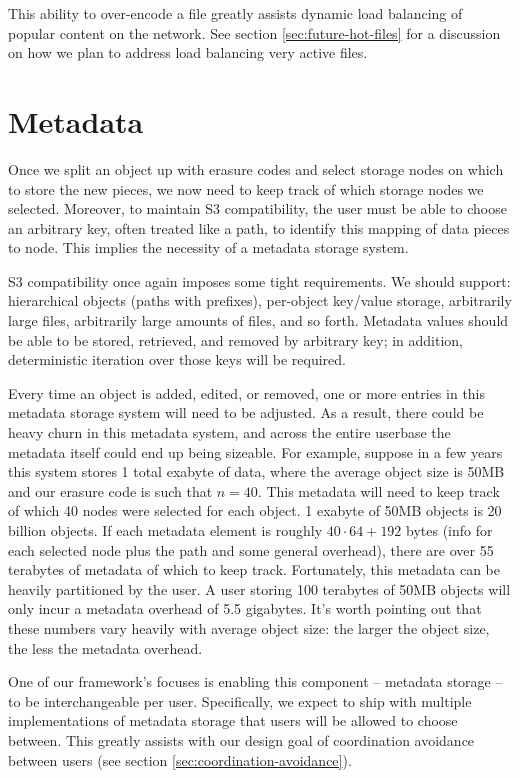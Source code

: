 \documentclass[11pt,fleqn,openany]{book}
\begin{document}
This ability to over-encode a file greatly assists dynamic load balancing of
popular content on the network. See section \ref{sec:future-hot-files} for
a discussion on how we plan to address load balancing very active files.

\section{Metadata}

Once we split an object up with erasure codes and select storage nodes on
which to store the new pieces, we now need to keep track of which storage
nodes we selected.
Moreover, to maintain S3 compatibility, the user must be able to choose an
arbitrary key, often treated like a path, to identify this mapping of data
pieces to node. This implies the necessity of a metadata storage system.

S3 compatibility once again imposes some tight requirements.
We should support:
hierarchical objects (paths with prefixes), per-object key/value storage,
arbitrarily large files, arbitrarily large amounts of files, and so forth.
Metadata values
should be able to be stored, retrieved, and removed by arbitrary key; in addition,
deterministic iteration over those keys will be required.

Every time an
object is added, edited, or removed, one or more entries in this metadata
storage system will need to be adjusted. As a result, there could be heavy churn
in this metadata system, and across the entire userbase the metadata itself
could end up being sizeable.
For example, suppose in
a few years this system stores 1 total exabyte of data, where the average object
size is 50MB and our erasure code is such that $n=40$. This metadata will need
to keep track of which 40 nodes were selected for each object.
1 exabyte of 50MB objects is 20 billion objects. If
each metadata element is roughly $40\cdot 64+192$ bytes (info for each
selected node plus the path and some general overhead), there are over 55
terabytes of metadata of which to keep track.
Fortunately, this metadata can be heavily partitioned by the user. A user storing
100 terabytes of 50MB objects will only incur a metadata overhead of 5.5
gigabytes. It's worth pointing out that these numbers vary
heavily with average object size: the larger the object size, the less the
metadata overhead.

One of our framework's focuses is enabling this component -- metadata
storage -- to be interchangeable per user. Specifically, we expect to ship with
multiple implementations of metadata storage that users will be allowed to
choose between. This greatly assists with our design goal of coordination
avoidance between users (see section \ref{sec:coordination-avoidance}).
\end{document}
